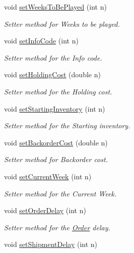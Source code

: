 \begin{DoxyCompactItemize}
void \hyperlink{class_game_abae5ec4f77327efde1516e8bd1edda2b}{set\+Weeks\+To\+Be\+Played} (int n)
\begin{DoxyCompactList}\small\item\em Setter method for Weeks to be played. \end{DoxyCompactList}\item 
void \hyperlink{class_game_a8da75fddaf91545459de45a52f604ebb}{set\+Info\+Code} (int n)
\begin{DoxyCompactList}\small\item\em Setter method for the Info code. \end{DoxyCompactList}\item 
void \hyperlink{class_game_a5136cc3fd07b605ed6df658024eb1e88}{set\+Holding\+Cost} (double n)
\begin{DoxyCompactList}\small\item\em Setter method for the Holding cost. \end{DoxyCompactList}\item 
void \hyperlink{class_game_aa994becb6fe955b2ed8dad3a24a57937}{set\+Starting\+Inventory} (int n)
\begin{DoxyCompactList}\small\item\em Setter method for the Starting inventory. \end{DoxyCompactList}\item 
void \hyperlink{class_game_a6526b895b01b619358918e5276314f43}{set\+Backorder\+Cost} (double n)
\begin{DoxyCompactList}\small\item\em Setter method for Backorder cost. \end{DoxyCompactList}\item 
void \hyperlink{class_game_a5d7966304ef0340bc9c1586bcee55738}{set\+Current\+Week} (int n)
\begin{DoxyCompactList}\small\item\em Setter method for the Current Week. \end{DoxyCompactList}\item 
void \hyperlink{class_game_adf895b54f74b8d95c4f67b15cef75290}{set\+Order\+Delay} (int n)
\begin{DoxyCompactList}\small\item\em Setter method for the \hyperlink{class_order}{Order} delay. \end{DoxyCompactList}\item 
void \hyperlink{class_game_a1b45bb18641fd7b60c2b887899fe4464}{set\+Shipment\+Delay} (int n)

\end{DoxyCompactItemize}

